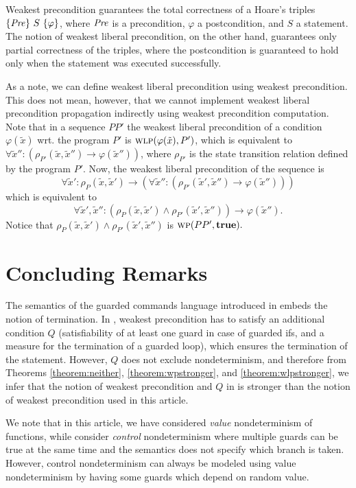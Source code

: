 \documentclass[times]{elsarticle}
\newcommand{\pred}[1]{\mbox{\textit{#1}}}
\newcommand{\ptrue}{\mbox{\textbf{true}}}
\newcommand{\WP}{\mbox{\textsc{wp}}}
\newcommand{\WLP}{\mbox{\textsc{wlp}}}
\begin{document}
Weakest precondition guarantees the total correctness of 
a Hoare's triples $\{\pred{Pre}\} ~ S ~ \{\varphi\}$, where 
$\pred{Pre}$ is a precondition, $\varphi$ a postcondition, and $S$
a statement. The notion of weakest liberal precondition, on the other 
hand, guarantees only partial correctness of the triples, where the 
postcondition is guaranteed to hold only when the statement was 
executed successfully. 

As a note, we can define weakest liberal precondition using weakest
precondition.  This does not mean, however, that we cannot implement
weakest liberal precondition propagation indirectly using weakest
precondition computation. Note that in a sequence $P P'$ the
weakest liberal precondition of a condition $\varphi(\tilde{x})$ wrt. the program $P'$ is
$\WLP(\varphi(\tilde{x}), P')$, which is equivalent to $\forall \tilde{x}'' :
(\rho_{P'}(\tilde{x},\tilde{x}'') \rightarrow \varphi(\tilde{x}''))$, where $\rho_{P'}$ is
the state transition relation defined by the program $P'.$ Now, the
weakest liberal precondition of the sequence is
\[
\forall \tilde{x}' : \rho_P(\tilde{x},\tilde{x}') \rightarrow (\forall \tilde{x}'' : (\rho_{P'}(\tilde{x}',\tilde{x}'') \rightarrow \varphi(\tilde{x}'')))
\]
which is equivalent to
\[
\forall \tilde{x}', \tilde{x}'' : (\rho_P(\tilde{x},\tilde{x}') \wedge \rho_{P'}(\tilde{x}',\tilde{x}'')) \rightarrow \varphi(\tilde{x}'').
\]
Notice that $\rho_P(\tilde{x},\tilde{x}') \wedge \rho_{P'}(\tilde{x}',\tilde{x}'')$ is $\WP(P P', \ptrue).$

\section{Concluding Remarks}
\label{sec:conclusion}

The semantics of the guarded commands language introduced in
\cite{dijkstra75gcl} embeds the notion of termination. In
\cite{dijkstra75gcl}, weakest precondition has to satisfy an
additional condition $Q$ (satisfiability of at least one guard in case
of guarded ifs, and a measure for the termination of a guarded loop),
which ensures the termination of the statement. However, $Q$ does not
exclude nondeterminism, and therefore from Theorems
\ref{theorem:neither}, \ref{theorem:wpstronger}, and
\ref{theorem:wlpstronger}, we infer that the notion of weakest
precondition and $Q$ in \cite{dijkstra76lang} is stronger than the
notion of weakest precondition used in this article.

We note that in this article, we have considered \emph{value\/}
nondeterminism of functions, while \cite{dijkstra75gcl} consider
\emph{control\/} nondeterminism where multiple guards can be true at
the same time and the semantics does not specify which branch is
taken. However, control nondeterminism can always be modeled using
value nondeterminism by having some guards which depend on random
value.
\end{document}
